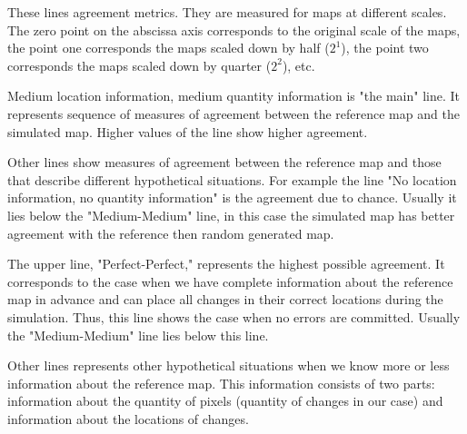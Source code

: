 \documentclass{report}
\begin{document}
These lines agreement metrics. They are measured for maps at different scales. 
The zero point on the abscissa axis corresponds to
the original scale of the maps, the point one corresponds the maps scaled down by half ($2^1$), the point
two corresponds the maps scaled down by quarter ($2^2$), etc.

Medium location information, medium quantity information is "the main" line.
It represents sequence of measures of agreement between the reference map and the simulated map.
Higher values of the line show higher agreement.

Other lines show  measures of agreement between the reference map and those that describe different hypothetical situations.
For example the line "No location information, no quantity information"  is the agreement due to chance.
Usually it lies below the "Medium-Medium" line, in this case the simulated map has better agreement with the reference 
then random generated map.

The upper line, "Perfect-Perfect," represents the highest possible agreement.
It corresponds to the case when we have complete information about the reference map in advance 
and can place all changes in their correct locations during the simulation.
Thus, this line shows the case when no errors are committed.
Usually the "Medium-Medium" line lies below this line.

Other lines represents other hypothetical situations when we know more or less information
about the reference map. This information consists of two parts: information about the quantity of pixels (quantity of changes in our case)
and information about the locations of changes.
\end{document}
